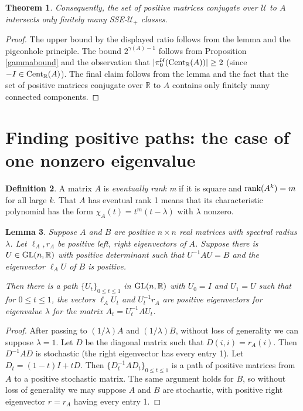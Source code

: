 \documentclass{amsart}
\newtheorem{theorem}{Theorem}[section]
\newtheorem{lemma}[theorem]{Lemma}
\theoremstyle{definition}
\newtheorem{definition}[theorem]{Definition}
\theoremstyle{remark}
\numberwithin{equation}{section}
\begin{document}
{{\begin{theorem}
Consequently, the set of positive matrices 
conjugate over $\mathcal U$ to $A$ intersects 
only finitely many SSE-$\mathcal U_+$ classes. 
\end{theorem} 

\begin{proof} 
The upper bound by the displayed ratio follows from 
the lemma and the pigeonhole principle. The bound 
$2^{\gamma(A)-1}$ follows from 
Proposition \ref{gammabound} and the observation that 
$|\pi_0^{\mathcal U}({\textnormal{Cent}_{\mathbb R}(A)})|\geq 2$ (since 
$-I\in  \textnormal{Cent}_{\mathbb R} (A) $).
The final claim follows from the lemma and the 
fact that the set of positive matrices conjugate 
over $\mathbb R$ to $A$ contains only finitely 
many connected components. 
\end{proof} 

\section{Finding positive paths: the case of one nonzero eigenvalue} 
\label{findingsec}

\begin{definition} 
A matrix $A$ is {\it eventually rank m} if it is square and 
$\textnormal{rank}(A^k)=m$ for all large $k$.  That $A$ has eventual rank 
1 means that its 
characteristic polynomial has the form $\chi_A(t)=t^m(t-\lambda )$ 
with $\lambda$ nonzero. 
\end{definition} 

\begin{lemma} \label{positivepath1} 
Suppose $A$ and $B$ are positive $n\times n$ 
real matrices with spectral radius $\lambda $. 
Let $\ell_A , r_A$ be  positive left, right 
eigenvectors of $A$. Suppose 
 there is 
$U\in \textnormal{GL}(n,\mathbb R)$ with positive determinant 
such that 
$U^{-1}AU=B$ and 
the eigenvector $\ell_AU$ of $B$ 
is positive. 

 Then there is a path $\{U_t\}_{0\leq t\leq 1}$ 
in $\textnormal{GL}(n, \mathbb R )$ with $U_0=I$ and $U_1=U$ 
such that for $0\leq t \leq 1$,
the 
vectors 
$\ell_AU_t$ and $U_t^{-1}r_A$ 
are positive eigenvectors 
for  eigenvalue $\lambda$ 
for the matrix 
$A_t=U_t^{-1}AU_t$.

\end{lemma} 

\begin{proof} 
After passing to $(1/\lambda)A $ and $(1/\lambda)B$, 
without loss of generality we can suppose $\lambda=1$. 
Let $D$ be the diagonal matrix such that $D(i,i)=r_A(i)$. 
Then $D^{-1}AD$ is stochastic (the right eigenvector has 
every entry 1). Let  $D_t= (1-t)I + tD$. Then  
$\{ D_t^{-1}AD_t\}_{0\leq t\leq 1}$  is a path of positive 
matrices from $A$ 
to a positive stochastic matrix. The same argument  holds for $B$, 
so without loss of generality 
 we may suppose $A$ and $B$ are stochastic, with positive 
right eigenvector $r=r_A$ having every entry 1. 


\end{proof}}}
\end{document}
